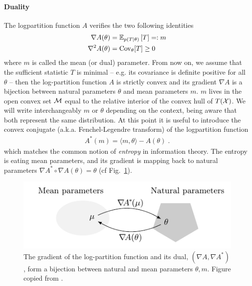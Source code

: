 \documentclass[twoside]{article}
\newcommand*{\expect}[2][]{\ensuremath{\mathbb{E}_{#1} \left[ #2 \right] }} %
\newcommand{\logpart}{A}
\newcommand{\conj}{\logpart^*}
\newcommand{\nat}{\theta}
\newcommand{\m}{m}
\newcommand{\meanp}{\m}
\begin{document}
\paragraph{Duality}
The logpartition function $\logpart$ verifies the two following identities
\begin{align}
    \nabla\logpart(\nat) &=  \expect[p(T|\nat)]{T} =: \meanp \\
    \nabla^2 \logpart(\nat) &= \Cov_\nat[T] \geq 0
\end{align}
where $\meanp$ is called the mean (or dual) parameter.
From now on, we assume that the sufficient statistic $T$ is minimal 
-- e.g. its covariance is definite positive for all $\nat$ -- 
then the log-partition function $\logpart$ is strictly convex and its gradient $\nabla \logpart$ is a bijection between natural parameters $\nat$ and mean parameters $\m$.
$\meanp$ lives in the open convex set ${\mathcal M}$ equal to the relative interior of the convex hull of $T({\mathcal X})$.
We will write interchangeably $\m$ or  $\nat$ depending on the context, being aware that both represent the same distribution.
At this point it is useful to introduce the convex conjugate (a.k.a. Fenchel-Legendre transform) of the logpartition function
\begin{align}
	\conj(\m) = \langle \m, \nat \rangle - \logpart(\nat) \; .
\end{align}
which matches the common notion of \textit{entropy} in information theory.
The entropy is eating mean parameters, and its gradient is mapping back to natural parameters $\nabla\conj \circ \nabla\logpart(\nat) = \nat$ (cf Fig.~\ref{fig:duality}).

\begin{figure}[ht]
	\centering
	\includegraphics{duality}
	\caption{The gradient of the log-partition function and its dual, $(\nabla \logpart, \nabla \conj)$, form a bijection between natural and mean parameters $\nat, \meanp$. Figure copied from \citet{kunstner2020homeomorphic}. %
	}
	\label{fig:duality}
\end{figure}
\end{document}

